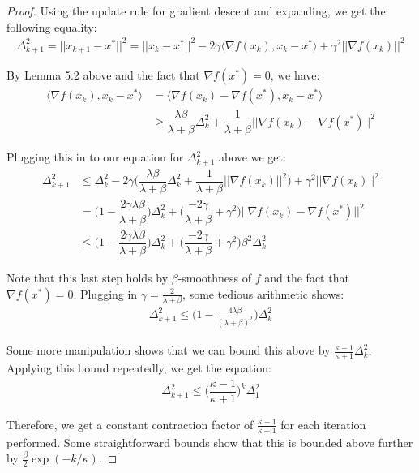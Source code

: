 \documentclass[12pt]{report}
\begin{document}
\begin{proof}
Using the update rule for gradient descent and expanding, we get the following equality:
\begin{align*}
\Delta_{k+1}^2 = ||x_{k+1}-x^*||^2 = ||x_k - x^*||^2 -2\gamma\langle \nabla f(x_k), x_k-x^*\rangle + \gamma^2||\nabla f(x_k)||^2\end{align*}

By Lemma 5.2 above and the fact that $\nabla f(x^*) = 0$, we have:
\begin{align*}
\langle \nabla f(x_k), x_k-x^*\rangle & = \langle \nabla f(x_k)-\nabla f(x^*), x_k-x^*\rangle\\
&\geq \dfrac{\lambda\beta}{\lambda+\beta}\Delta_k^2 + \dfrac{1}{\lambda+\beta}||\nabla f(x_k)-\nabla f(x^*)||^2\end{align*}

Plugging this in to our equation for $\Delta_{k+1}^2$ above we get:
\begin{align*}
\Delta_{k+1}^2 &\leq \Delta_k^2 -2\gamma\bigg(\dfrac{\lambda\beta}{\lambda+\beta}\Delta_k^2 + \dfrac{1}{\lambda+\beta}||\nabla f(x_k)||^2\bigg) + \gamma^2||\nabla f(x_k)||^2\\
&= \bigg(1-\dfrac{2\gamma\lambda\beta}{\lambda+\beta}\bigg)\Delta_k^2 + \bigg(\dfrac{-2\gamma}{\lambda+\beta} + \gamma^2\bigg)||\nabla f(x_k) - \nabla f(x^*)||^2\\
&\leq \bigg(1-\dfrac{2\gamma\lambda\beta}{\lambda+\beta}\bigg)\Delta_k^2 + \bigg(\dfrac{-2\gamma}{\lambda+\beta} + \gamma^2\bigg)\beta^2\Delta_k^2
\end{align*}

Note that this last step holds by $\beta$-smoothness of $f$ and the fact that $\nabla f(x^*) = 0$. Plugging in $\gamma = \frac{2}{\lambda+\beta}$, some tedious arithmetic shows:
\begin{align*}
\Delta_{k+1}^2 \leq \bigg(1 - \frac{4\lambda\beta}{(\lambda+\beta)^2}\bigg)\Delta_k^2\end{align*}

Some more manipulation shows that we can bound this above by $\frac{\kappa-1}{\kappa+1}\Delta_k^2$. Applying this bound repeatedly, we get the equation:
\begin{align*}
\Delta_{k+1}^2 \leq \bigg(\dfrac{\kappa-1}{\kappa+1}\bigg)^k\Delta_1^2\end{align*}

Therefore, we get a constant contraction factor of $\frac{\kappa-1}{\kappa+1}$ for each iteration performed. Some straightforward bounds show that this is bounded above further by $\frac{\beta}{2}\exp(-k/\kappa)$.
\end{proof}
\end{document}
